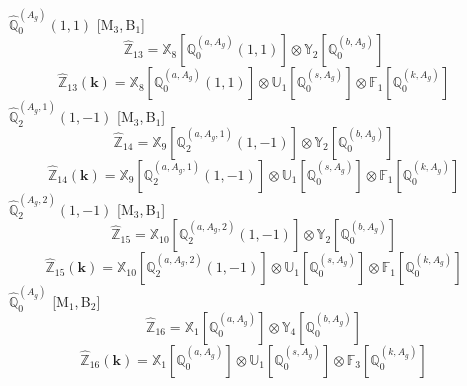 \documentclass[fleqn,10pt,landscape]{article}
\begin{document}
\begin{itemize}
\vspace{4mm}
\noindent {} $\,\,\,\hat{\mathbb{Q}}_{0}^{(A_{g})}(1,1)$ [M$_{3}$,\,B$_{1}$]
\begin{dmath*}
\hat{\mathbb{Z}}_{13}=\mathbb{X}_{8}[\mathbb{Q}_{0}^{(a,A_{g})}(1,1)] \otimes\mathbb{Y}_{2}[\mathbb{Q}_{0}^{(b,A_{g})}]
\end{dmath*}
\begin{dmath*}
\hat{\mathbb{Z}}_{13}(\bm{k})=\mathbb{X}_{8}[\mathbb{Q}_{0}^{(a,A_{g})}(1,1)] \otimes\mathbb{U}_{1}[\mathbb{Q}_{0}^{(s,A_{g})}] \otimes\mathbb{F}_{1}[\mathbb{Q}_{0}^{(k,A_{g})}]
\end{dmath*}
\vspace{4mm}
\noindent {} $\,\,\,\hat{\mathbb{Q}}_{2}^{(A_{g},1)}(1,-1)$ [M$_{3}$,\,B$_{1}$]
\begin{dmath*}
\hat{\mathbb{Z}}_{14}=\mathbb{X}_{9}[\mathbb{Q}_{2}^{(a,A_{g},1)}(1,-1)] \otimes\mathbb{Y}_{2}[\mathbb{Q}_{0}^{(b,A_{g})}]
\end{dmath*}
\begin{dmath*}
\hat{\mathbb{Z}}_{14}(\bm{k})=\mathbb{X}_{9}[\mathbb{Q}_{2}^{(a,A_{g},1)}(1,-1)] \otimes\mathbb{U}_{1}[\mathbb{Q}_{0}^{(s,A_{g})}] \otimes\mathbb{F}_{1}[\mathbb{Q}_{0}^{(k,A_{g})}]
\end{dmath*}
\vspace{4mm}
\noindent {} $\,\,\,\hat{\mathbb{Q}}_{2}^{(A_{g},2)}(1,-1)$ [M$_{3}$,\,B$_{1}$]
\begin{dmath*}
\hat{\mathbb{Z}}_{15}=\mathbb{X}_{10}[\mathbb{Q}_{2}^{(a,A_{g},2)}(1,-1)] \otimes\mathbb{Y}_{2}[\mathbb{Q}_{0}^{(b,A_{g})}]
\end{dmath*}
\begin{dmath*}
\hat{\mathbb{Z}}_{15}(\bm{k})=\mathbb{X}_{10}[\mathbb{Q}_{2}^{(a,A_{g},2)}(1,-1)] \otimes\mathbb{U}_{1}[\mathbb{Q}_{0}^{(s,A_{g})}] \otimes\mathbb{F}_{1}[\mathbb{Q}_{0}^{(k,A_{g})}]
\end{dmath*}
\vspace{4mm}
\noindent {} $\,\,\,\hat{\mathbb{Q}}_{0}^{(A_{g})}$ [M$_{1}$,\,B$_{2}$]
\begin{dmath*}
\hat{\mathbb{Z}}_{16}=\mathbb{X}_{1}[\mathbb{Q}_{0}^{(a,A_{g})}] \otimes\mathbb{Y}_{4}[\mathbb{Q}_{0}^{(b,A_{g})}]
\end{dmath*}
\begin{dmath*}
\hat{\mathbb{Z}}_{16}(\bm{k})=\mathbb{X}_{1}[\mathbb{Q}_{0}^{(a,A_{g})}] \otimes\mathbb{U}_{1}[\mathbb{Q}_{0}^{(s,A_{g})}] \otimes\mathbb{F}_{3}[\mathbb{Q}_{0}^{(k,A_{g})}]
\end{dmath*}

\end{itemize}
\end{document}
